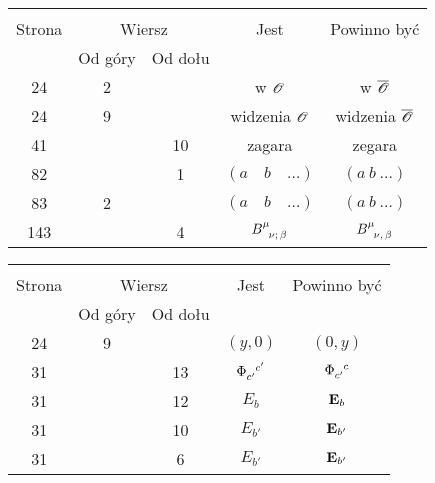 \documentclass[a4paper,11pt]{article}
\begin{document}
\begin{center}

  \begin{tabular}{|c|c|c|c|c|}
    \hline
    & \multicolumn{2}{c|}{} & & \\
    Strona & \multicolumn{2}{c|}{Wiersz} & Jest
                              & Powinno być \\ \cline{2-3}
    & Od góry & Od dołu & & \\
    \hline
    24 & 2 & & w $\mathcal{O}$ & w $\overline{ \mathcal{O} }$ \\
    24 & 9 & & widzenia $\mathcal{O}$ & widzenia $\overline{ \mathcal{O} }$ \\
    41 & & 10 & zagara & zegara \\
    82 & & 1 & $( a \quad b \quad \ldots )$ & $( a \: b \: \ldots )$ \\
    83 & 2 & & $( a \quad b \quad \ldots )$ & $( a \: b \: \ldots )$ \\
    143 & & 4 & $B\indices{^\mu_\nu_{;\, \beta}}$ & $B\indices{^\mu_\nu_{,\, \beta}}$ \\
    \hline
  \end{tabular}

\end{center}


\vspace{\spaceTwo}














\begin{center}

  \begin{tabular}{|c|c|c|c|c|}
    \hline
    & \multicolumn{2}{c|}{} & & \\
    Strona & \multicolumn{2}{c|}{Wiersz} & Jest & Powinno być \\ \cline{2-3}
    & Od góry & Od dołu &  &  \\
    \hline
    24 & 9 & & $( y, 0 )$ & $( 0, y )$ \\
    31 & & 13 & $\tensor[]{\Phi}{ _{c'}^{c'} }$ & $\tensor[]{\Phi}{ _{c'}^{c} }$ \\
    31 & & 12 & $E_{ b }$ & $\mathbf{E}_{ b }$ \\
    31 & & 10 & $E_{ b' }$ & $\mathbf{E}_{ b' }$ \\
    31 & & 6 & $E_{ b' }$ & $\mathbf{E}_{ b' }$ \\
    \hline
  \end{tabular}

\end{center}
\end{document}
